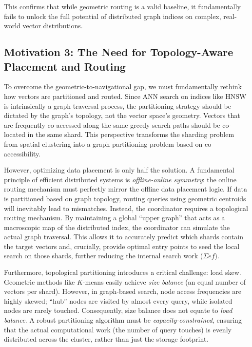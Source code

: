 This confirms that while geometric routing is a valid baseline, it fundamentally fails to unlock the full potential of distributed graph indices on complex, real-world vector distributions.

\subsection{Motivation 3: The Need for Topology-Aware Placement and Routing}
\label{subsec:motivation_topology}

To overcome the geometric-to-navigational gap, we must fundamentally rethink how vectors are partitioned and routed. Since ANN search on indices like HNSW is intrinsically a graph traversal process, the partitioning strategy should be dictated by the graph's topology, not the vector space's geometry. Vectors that are frequently co-accessed along the same greedy search paths should be co-located in the same shard. This perspective transforms the sharding problem from spatial clustering into a graph partitioning problem based on co-accessibility.

However, optimizing data placement is only half the solution. A fundamental principle of efficient distributed systems is \textit{offline-online symmetry}: the online routing mechanism must perfectly mirror the offline data placement logic. If data is partitioned based on graph topology, routing queries using geometric centroids will inevitably lead to mismatches. Instead, the coordinator requires a topological routing mechanism. By maintaining a global ``upper graph'' that acts as a macroscopic map of the distributed index, the coordinator can simulate the actual graph traversal. This allows it to accurately predict which shards contain the target vectors and, crucially, provide optimal entry points to seed the local search on those shards, further reducing the internal search work ($\Sigma ef$).

Furthermore, topological partitioning introduces a critical challenge: load skew. Geometric methods like $K$-means easily achieve \textit{size balance} (an equal number of vectors per shard). However, in graph-based search, node access frequencies are highly skewed; ``hub'' nodes are visited by almost every query, while isolated nodes are rarely touched. Consequently, size balance does not equate to \textit{load balance}. A robust partitioning algorithm must be \textit{capacity-constrained}, ensuring that the actual computational work (the number of query touches) is evenly distributed across the cluster, rather than just the storage footprint.

